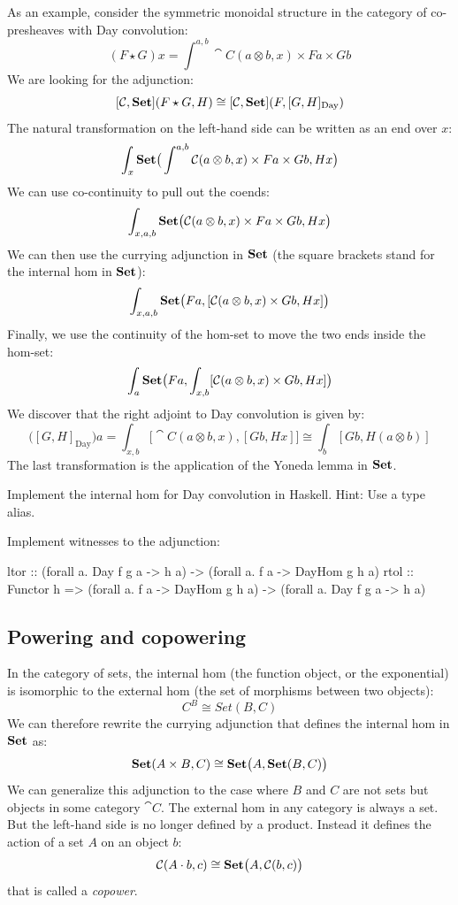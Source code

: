 \documentclass[DaoFP]{subfiles}
\begin{document}
As an example, consider the symmetric monoidal structure in the category of co-presheaves with Day convolution:
\[ (F \star G) x = \int^{a, b} \cat C (a \otimes b, x) \times F a \times G b \]
We are looking for the adjunction:
\[ [\mathcal{C}, \mathbf{Set}] (F \star G, H) \cong  [\mathcal{C}, \mathbf{Set}] (F, [G, H]_{\text{Day}}) \]
The natural transformation on the left-hand side can be written as an end over $x$:
\[ \int_x \mathbf{Set} \big( \int^{a, b} \mathcal{C} (a \otimes b, x) \times F a \times G b, H x \big) \]
We can use co-continuity to pull out the coends:
\[ \int_{x, a, b} \mathbf{Set} \big( \mathcal{C} (a \otimes b, x) \times F a \times G b, H x \big) \]
We can then use the currying adjunction in $\mathbf{Set}$ (the square brackets stand for the internal hom in $\mathbf{Set}$):
\[ \int_{x, a, b} \mathbf{Set} \big( F a, [\mathcal{C} (a \otimes b, x)  \times G b, H x] \big) \]
Finally, we use the continuity of the hom-set to move the two ends inside the hom-set:
\[ \int_{a} \mathbf{Set} \big( F a, \int_{x, b} [\mathcal{C} (a \otimes b, x)  \times G b, H x] \big) \]
We discover that the right adjoint to Day convolution is given by:
\[ \big([G, H]_{\text{Day}}\big) a = \int_{x, b} \big[\cat C(a \otimes b, x), [G b, H x]\big] \cong \int_b [G b, H (a \otimes b)]\]
The last transformation is the application of the Yoneda lemma in $\mathbf{Set}$.
\begin{exercise}
Implement the internal hom for Day convolution in Haskell. Hint: Use a type alias.
\end{exercise}
\begin{exercise}
Implement witnesses to the adjunction:
\begin{haskell}
ltor :: (forall a. Day f g a -> h a) -> (forall a. f a -> DayHom g h a)
rtol :: Functor h => 
  (forall a. f a -> DayHom g h a) -> (forall a. Day f g a -> h a)
\end{haskell}
\end{exercise}

\subsection{Powering and copowering}

In the category of sets, the internal hom (the function object, or the exponential) is isomorphic to the external hom (the set of morphisms between two objects):
\[ C^B \cong Set(B, C) \]
We can therefore rewrite the currying adjunction that defines the internal hom in $\mathbf{Set}$ as:
\[ \mathbf{Set} (A \times B, C)  \cong \mathbf{Set} \big(A, \mathbf{Set} (B, C)\big) \]
We can generalize this adjunction to the case where $B$ and $C$ are not sets but objects in some category $\cat C$. The external hom in any category is always a set. But the left-hand side is no longer defined by a product. Instead it defines the action of a set $A$ on an object $b$:
\[ \mathcal{C} (A \cdot b, c) \cong \mathbf{Set} \big( A, \mathcal{C} (b, c)\big) \]
that is called a \emph{copower}.
\end{document}
